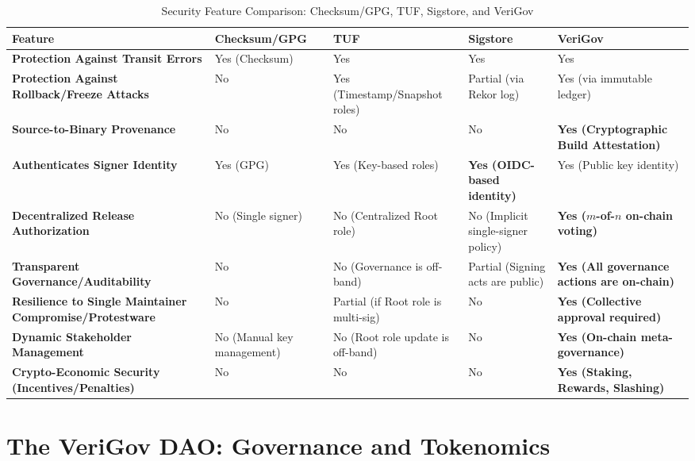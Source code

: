 \documentclass{article}
\begin{document}
\begin{table}[H]
    \centering
    \caption{Security Feature Comparison: Checksum/GPG, TUF, Sigstore, and VeriGov}
    \label{tab:security_comparison}
    \small %
    \begin{tabularx}{\textwidth}{>{\bfseries}L L L L L}
        \toprule
        \textbf{Feature} & \textbf{Checksum/GPG} & \textbf{TUF} & \textbf{Sigstore} & \textbf{VeriGov} \\
        \midrule
        Protection Against Transit Errors & Yes (Checksum) & Yes & Yes & Yes \\
        \addlinespace
        Protection Against Rollback/Freeze Attacks & No & Yes (Timestamp/Snapshot roles) & Partial (via Rekor log) & Yes (via immutable ledger) \\
        \addlinespace
        Source-to-Binary Provenance & No & No & No & \textbf{Yes (Cryptographic Build Attestation)} \\
        \addlinespace
        Authenticates Signer Identity & Yes (GPG) & Yes (Key-based roles) & \textbf{Yes (OIDC-based identity)} & Yes (Public key identity) \\
        \addlinespace
        Decentralized Release Authorization & No (Single signer) & No (Centralized Root role) & No (Implicit single-signer policy) & \textbf{Yes ($m$-of-$n$ on-chain voting)} \\
        \addlinespace
        Transparent Governance/Auditability & No & No (Governance is off-band) & Partial (Signing acts are public) & \textbf{Yes (All governance actions are on-chain)} \\
        \addlinespace
        Resilience to Single Maintainer Compromise/Protestware & No & Partial (if Root role is multi-sig) & No & \textbf{Yes (Collective approval required)} \\
        \addlinespace
        Dynamic Stakeholder Management & No (Manual key management) & No (Root role update is off-band) & No & \textbf{Yes (On-chain meta-governance)} \\
        \addlinespace
        Crypto-Economic Security (Incentives/Penalties) & No & No & No & \textbf{Yes (Staking, Rewards, Slashing)} \\
        \bottomrule
    \end{tabularx}
\end{table}

\section{The VeriGov DAO: Governance and Tokenomics}
\label{sec:the-verigov-dao-governance-and-tokenomics}
\end{document}
